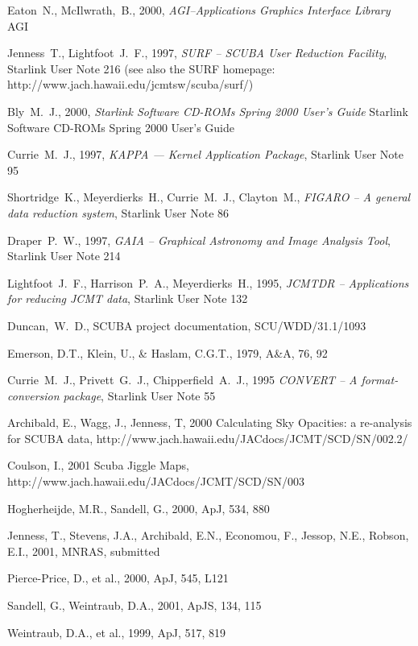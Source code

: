 \documentclass[twoside,11pt]{article}
\newcommand{\htmladdnormallink}[2]{#1}
\newcommand{\xref}[3]{#1}
\renewcommand{\_}{\texttt{\symbol{95}}}
\begin{document}
\begin{thebibliography}{}

 Eaton~N., McIlwrath,~B., 2000, \textit{AGI--Applications Graphics
Interface Library}
\xref{AGI}{sun48}{}

Jenness~T., Lightfoot~J.~F., 1997, \textit{SURF -- SCUBA User
Reduction Facility},
\xref{Starlink User Note 216}{sun216}{} (see also the SURF homepage:
\htmladdnormallink{http://www.jach.hawaii.edu/jcmt\_sw/scuba/surf/}{http://www.jach.hawaii.edu/jcmt_sw/scuba/surf/})


Bly~M.~J., 2000, {\it Starlink  Software CD-ROMs Spring 2000 User's
Guide}
\xref{Starlink  Software CD-ROMs Spring 2000 User's Guide}{sun212}{}


Currie~M.~J., 1997, {\it KAPPA --- Kernel Application Package},
\xref{Starlink User Note 95}{sun95}{}

Shortridge~K., Meyerdierks~H., Currie~M.~J., Clayton~M.,
{\it FIGARO -- A general data reduction system},
\xref{Starlink User Note 86}{sun86}{}

Draper~P.~W., 1997, {\it GAIA -- Graphical Astronomy and Image
Analysis Tool},
\xref{Starlink User Note 214}{sun214}{}


Lightfoot~J.~F., Harrison~P.~A., Meyerdierks~H., 1995, \textit{JCMTDR
-- Applications for reducing JCMT data}, \xref{Starlink User Note
132}{sun132}{}


Duncan,~W.~D., SCUBA project documentation, SCU/WDD/31.1/1093

Emerson, D.T., Klein, U., \& Haslam, C.G.T., 1979, A\&A, 76, 92

Currie~M.~J., Privett~G.~J., Chipperfield~A.~J., 1995 {\it CONVERT --
A format-conversion package}, \xref{Starlink User Note 55}{sun55}{}

Archibald, E., Wagg, J., Jenness, T, 2000 {Calculating Sky Opacities:
a
re-analysis for SCUBA data},
{\htmladdnormallink{http://www.jach.hawaii.edu/JACdocs/JCMT/SCD/SN/002.2/}{http://www.jach.hawaii.edu/JACdocs/JCMT/SCD/SN/002.2/

} }

Coulson, I., 2001 { Scuba Jiggle Maps},
{\htmladdnormallink{http://www.jach.hawaii.edu/JACdocs/JCMT/SCD/SN/003}{http://www.jach.hawaii.edu/JACdocs/JCMT/SCD/SN/003}}

Hogherheijde, M.R., Sandell, G., 2000, ApJ, 534, 880

Jenness, T., Stevens, J.A., Archibald, E.N., Economou, F., Jessop,
N.E., Robson, E.I., 2001, MNRAS, submitted

Pierce-Price, D., et al., 2000, ApJ, 545, L121

Sandell, G., Weintraub, D.A., 2001, ApJS, 134, 115

Weintraub, D.A., et al., 1999, ApJ, 517, 819


\end{thebibliography}
\end{document}
